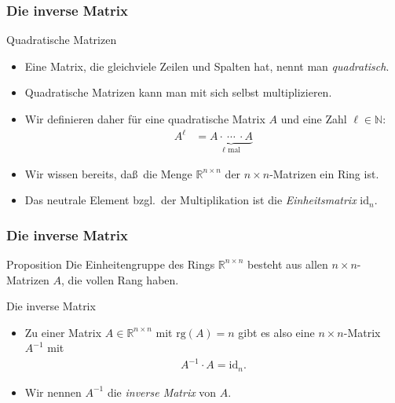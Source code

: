 \documentclass{beamer}
\title[Linadi]{\mytitle}
\author[Amin Coja-Oghlan]{Amin Coja-Oghlan}
\institute[Frankfurt]{JWGUFFM}
\date{}
\renewcommand{\emph}[1]{{\textcolor{solarizedRed}{\itshape #1}}}
\newcommand\NN{\mathbb N}
\newcommand\RR{\mathbb R}
\newcommand{\id}{\mathrm{id}}
\newcommand{\ue}{\"u}
\newcommand{\rk}{\mathrm{rg}}
\newcommand{\mytitle}{Die inverse Matrix}
\begin{document}
\frame[plain]{\titlepage}

\begin{frame}\frametitle{\mytitle}
	\begin{block}{Quadratische Matrizen}
	\begin{itemize}
		\item Eine Matrix, die gleichviele Zeilen und Spalten hat, nennt man \emph{quadratisch}.
		\item Quadratische Matrizen kann man mit sich selbst multiplizieren.
		\item Wir definieren daher f\ue r eine quadratische Matrix $A$ und eine Zahl $\ell\in\NN$:
			\begin{align*}
				A^\ell&=\underbrace{A\cdot\ \cdots\ \cdot A}_{\mbox{$\ell$ mal}}
			\end{align*}
		\item Wir wissen bereits, da\ss\ die Menge $\RR^{n\times n}$ der $n\times n$-Matrizen ein Ring ist.
		\item Das neutrale Element bzgl.\ der Multiplikation ist die \emph{Einheitsmatrix} $\id_n$.
	\end{itemize}
	\end{block}
\end{frame}

\begin{frame}\frametitle{\mytitle}
	\begin{block}{Proposition}
		Die Einheitengruppe des Rings $\RR^{n\times n}$ besteht aus allen $n\times n$-Matrizen $A$, die vollen Rang haben.
	\end{block}
	\begin{block}{Die inverse Matrix}
		\begin{itemize}
			\item Zu einer Matrix $A\in\RR^{n\times n}$ mit $\rk(A)=n$ gibt es also eine $n\times n$-Matrix $A^{-1}$ mit
				\begin{align*}
					A^{-1}\cdot A=\id_n.
				\end{align*}
			\item Wir nennen $A^{-1}$ die \emph{inverse Matrix} von $A$.
		\end{itemize}
	\end{block}
\end{frame}
\end{document}
